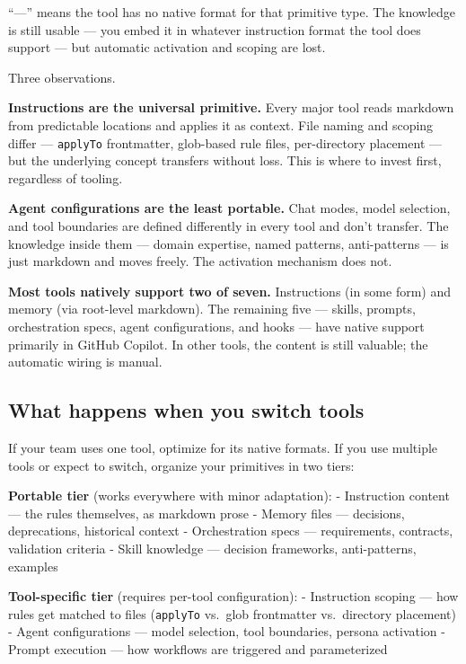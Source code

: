 \documentclass[
  a4paper,
  DIV=11,
  numbers=noendperiod]{scrreprt}
\begin{document}
``---'' means the tool has no native format for that primitive type. The
knowledge is still usable --- you embed it in whatever instruction
format the tool does support --- but automatic activation and scoping
are lost.

Three observations.

\textbf{Instructions are the universal primitive.} Every major tool
reads markdown from predictable locations and applies it as context.
File naming and scoping differ --- \texttt{applyTo} frontmatter,
glob-based rule files, per-directory placement --- but the underlying
concept transfers without loss. This is where to invest first,
regardless of tooling.

\textbf{Agent configurations are the least portable.} Chat modes, model
selection, and tool boundaries are defined differently in every tool and
don't transfer. The knowledge inside them --- domain expertise, named
patterns, anti-patterns --- is just markdown and moves freely. The
activation mechanism does not.

\textbf{Most tools natively support two of seven.} Instructions (in some
form) and memory (via root-level markdown). The remaining five ---
skills, prompts, orchestration specs, agent configurations, and hooks
--- have native support primarily in GitHub Copilot. In other tools, the
content is still valuable; the automatic wiring is manual.

\subsection{What happens when you switch
tools}\label{what-happens-when-you-switch-tools}

If your team uses one tool, optimize for its native formats. If you use
multiple tools or expect to switch, organize your primitives in two
tiers:

\textbf{Portable tier} (works everywhere with minor adaptation): -
Instruction content --- the rules themselves, as markdown prose - Memory
files --- decisions, deprecations, historical context - Orchestration
specs --- requirements, contracts, validation criteria - Skill knowledge
--- decision frameworks, anti-patterns, examples

\textbf{Tool-specific tier} (requires per-tool configuration): -
Instruction scoping --- how rules get matched to files (\texttt{applyTo}
vs.~glob frontmatter vs.~directory placement) - Agent configurations ---
model selection, tool boundaries, persona activation - Prompt execution
--- how workflows are triggered and parameterized
\end{document}

